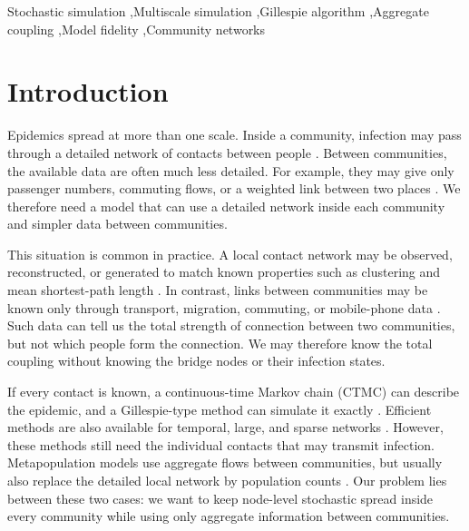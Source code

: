 \documentclass[a4paper,fleqn]{cas-sc}
\begin{document}
\begin{keywords}
Stochastic simulation \sep Multiscale simulation \sep Gillespie algorithm \sep Aggregate coupling \sep Model fidelity \sep Community networks
\end{keywords}

\maketitle

\clearpage
\begingroup\color{black}
\hypersetup{citecolor=black,linkcolor=black}

\section{Introduction}
\label{sec:introduction}

Epidemics spread at more than one scale. Inside a community, infection may pass through a detailed network of contacts between people \citep{keeling2005,pastorsatorras2015,kiss2017}. Between communities, the available data are often much less detailed. For example, they may give only passenger numbers, commuting flows, or a weighted link between two places \citep{balcan2009,barbosa2018human}. We therefore need a model that can use a detailed network inside each community and simpler data between communities.

This situation is common in practice. A local contact network may be observed, reconstructed, or generated to match known properties such as clustering and mean shortest-path length \citep{eubank2004,danon2011}. In contrast, links between communities may be known only through transport, migration, commuting, or mobile-phone data \citep{barbosa2018human,chang2021}. Such data can tell us the total strength of connection between two communities, but not which people form the connection. We may therefore know the total coupling without knowing the bridge nodes or their infection states.

If every contact is known, a continuous-time Markov chain (CTMC) can describe the epidemic, and a Gillespie-type method can simulate it exactly \citep{gillespie1977exact,gibson2000}. Efficient methods are also available for temporal, large, and sparse networks \citep{vestergaard2015,kuryliak2025simulating}. However, these methods still need the individual contacts that may transmit infection. Metapopulation models use aggregate flows between communities, but usually also replace the detailed local network by population counts \citep{colizza2007reaction,colizza2008,balcan2010modeling,ajelli2010}. Our problem lies between these two cases: we want to keep node-level stochastic spread inside every community while using only aggregate information between communities.
\end{document}
